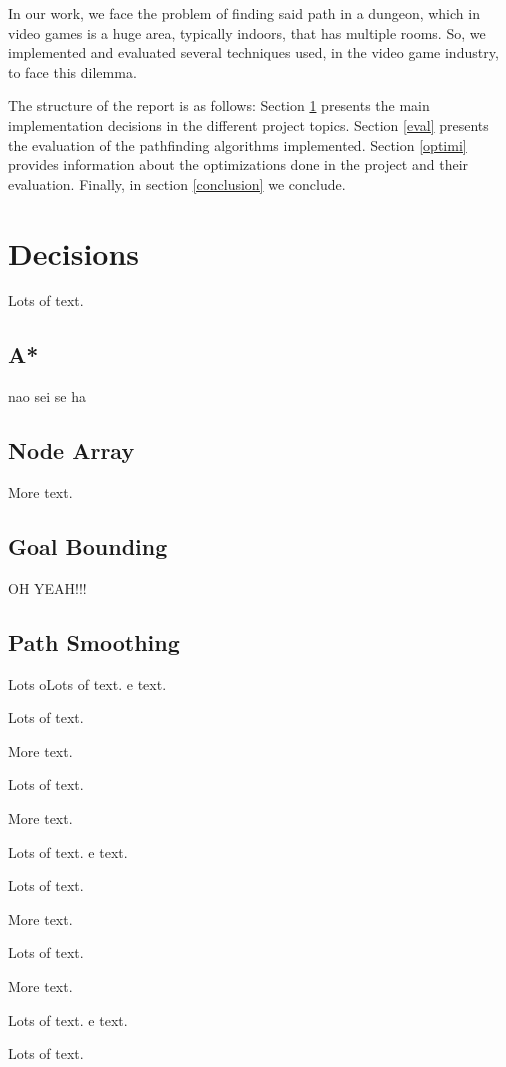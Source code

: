 \documentclass{sigplanconf}[10pt]
\begin{document}
In our work, we face the problem of finding said path in a dungeon, which in video games is a huge area, typically indoors, that has multiple rooms. So, we implemented and evaluated several techniques used, in the video game industry, to face this dilemma.

The structure of the report is as follows: Section \ref{decisions} presents the main implementation decisions in the different project topics. Section \ref{eval} presents the evaluation of the pathfinding algorithms implemented. Section \ref{optimi} provides information about the optimizations done in the project and their evaluation. Finally, in section \ref{conclusion} we conclude.

\section{Decisions}
\label{decisions}
Lots of text.

\subsection{A*}
nao sei se ha

\subsection{Node Array}

More text.

\subsection{Goal Bounding}
OH YEAH!!!

\subsection{Path Smoothing}

Lots oLots of text.
e text.

Lots of text.

More text.

Lots of text.

More text.

Lots of text.
e text.

Lots of text.

More text.

Lots of text.

More text.

Lots of text.
e text.

Lots of text.
\end{document}
